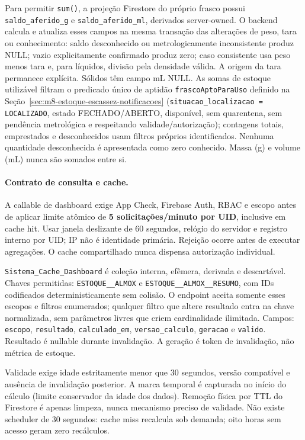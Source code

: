 Para permitir \texttt{sum()}, a projeção Firestore do próprio frasco possui \texttt{saldo\_aferido\_g} e \texttt{saldo\_aferido\_ml}, derivados server-owned. O backend calcula e atualiza esses campos na mesma transação das alterações de peso, tara ou conhecimento: saldo desconhecido ou metrologicamente inconsistente produz NULL; vazio explicitamente confirmado produz zero; caso consistente usa peso menos tara e, para líquidos, divisão pela densidade válida. A origem da tara permanece explícita. Sólidos têm campo mL NULL. As somas de estoque utilizável filtram o predicado único de aptidão \texttt{frascoAptoParaUso} definido na Seção~\ref{sec:m8-estoque-escassez-notificacoes} (\texttt{situacao\_localizacao = LOCALIZADO}, estado FECHADO/ABERTO, disponível, sem quarentena, sem pendência metrológica e respeitando validade/autorização); contagens totais, emprestados e desconhecidos usam filtros próprios identificados. Nenhuma quantidade desconhecida é apresentada como zero conhecido. Massa (g) e volume (mL) nunca são somados entre si.

\paragraph{Contrato de consulta e cache.}
A callable de dashboard exige App Check, Firebase Auth, RBAC e escopo antes de aplicar limite atômico de \textbf{5 solicitações/minuto por UID}, inclusive em cache hit. Usar janela deslizante de 60 segundos, relógio do servidor e registro interno por UID; IP não é identidade primária. Rejeição ocorre antes de executar agregações. O cache compartilhado nunca dispensa autorização individual.

\texttt{Sistema\_Cache\_Dashboard} é coleção interna, efêmera, derivada e descartável. Chaves permitidas: \texttt{ESTOQUE\_\_ALMOX} e \texttt{ESTOQUE\_\_ALMOX\_\_RESUMO}, com IDs codificados deterministicamente sem colisão. O endpoint aceita somente esses escopos e filtros enumerados; qualquer filtro que altere resultado entra na chave normalizada, sem parâmetros livres que criem cardinalidade ilimitada. Campos: \texttt{escopo}, \texttt{resultado}, \texttt{calculado\_em}, \texttt{versao\_calculo}, \texttt{geracao} e \texttt{valido}. Resultado é nullable durante invalidação. A geração é token de invalidação, não métrica de estoque.

Validade exige idade estritamente menor que 30 segundos, versão compatível e ausência de invalidação posterior. A marca temporal é capturada no início do cálculo (limite conservador da idade dos dados). Remoção física por TTL do Firestore é apenas limpeza, nunca mecanismo preciso de validade. Não existe scheduler de 30 segundos: cache miss recalcula sob demanda; oito horas sem acesso geram zero recálculos.

